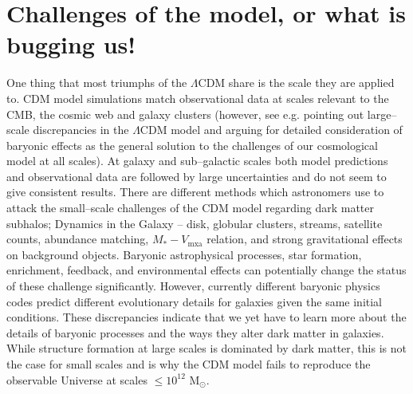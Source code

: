 \documentclass[a4wide,12pt]{book}
\newcommand{\msun }{$\mathrm{M}_{\odot}$}
\begin{document}
{\section{Challenges of the model, or what is bugging us!}
\label{subsec:LCDM_challenges}
One thing that most triumphs of the $\Lambda$CDM share is the scale they are applied to. CDM model simulations match observational data at scales relevant to the CMB, the cosmic web and galaxy clusters (however, see e.g. \citet{Guo+2011} pointing out large--scale discrepancies in the $\Lambda$CDM model and arguing for detailed consideration of baryonic effects as the general solution to the challenges of our cosmological model at all scales). At galaxy and sub--galactic scales both model predictions and observational data are followed by large uncertainties and do not seem to give consistent results. There are different methods which astronomers use to attack the small--scale challenges of the CDM model regarding dark matter subhalos; Dynamics in the Galaxy -- disk, globular clusters, streams, satellite counts, abundance matching, $M_* - V_\mathrm{mxa}$ relation, and strong gravitational effects on background objects. Baryonic astrophysical processes, star formation, enrichment, feedback, and environmental effects can potentially change the status of these challenge significantly. However, currently different baryonic physics codes predict different evolutionary details for galaxies given the same initial conditions. These discrepancies indicate that we yet have to learn more about the details of baryonic processes and the ways they alter dark matter in galaxies. While structure formation at large scales is dominated by dark matter, this is not the case for small scales and is why the CDM model fails to reproduce the observable Universe at scales $\leq 10^{12} $ \msun .

}
\end{document}
